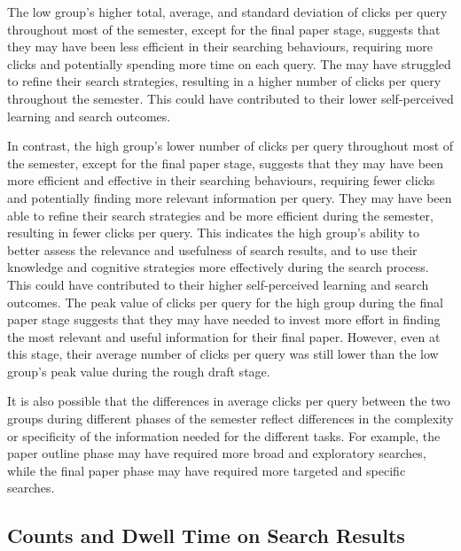 \documentclass[letterpaper, nobind]{templates/ociamthesis}
\begin{document}
The low group's higher total, average, and standard deviation of clicks per query throughout most of the semester, except for the final paper stage, suggests that they may have been less efficient in their searching behaviours, requiring more clicks and potentially spending more time on each query.
The may have struggled to refine their search strategies, resulting in a higher number of clicks per query throughout the semester.
This could have contributed to their lower self-perceived learning and search outcomes.

In contrast, the high group's lower number of clicks per query throughout most of the semester, except for the final paper stage, suggests that they may have been more efficient and effective in their searching behaviours, requiring fewer clicks and potentially finding more relevant information per query.
They may have been able to refine their search strategies and be more efficient during the semester, resulting in fewer clicks per query.
This indicates the high group's ability to better assess the relevance and usefulness of search results, and to use their knowledge and cognitive strategies more effectively during the search process.
This could have contributed to their higher self-perceived learning and search outcomes.
The peak value of clicks per query for the high group during the final paper stage suggests that they may have needed to invest more effort in finding the most relevant and useful information for their final paper.
However, even at this stage, their average number of clicks per query was still lower than the low group's peak value during the rough draft stage.

It is also possible that the differences in average clicks per query between the two groups during different phases of the semester reflect differences in the complexity or specificity of the information needed for the different tasks. For example, the paper outline phase may have required more broad and exploratory searches, while the final paper phase may have required more targeted and specific searches.

\hypertarget{sec-phase2-res-L-dt}{%
\subsection{Counts and Dwell Time on Search Results}\label{sec-phase2-res-L-dt}}
\end{document}
